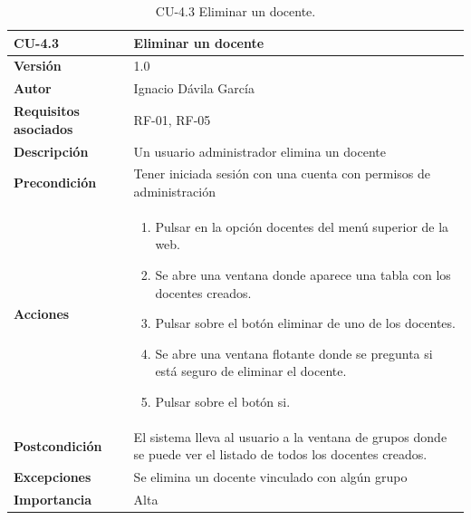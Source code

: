 \begin{table}[p]
	\centering
	\begin{tabularx}{\linewidth}{ p{} p{} }
		\toprule
		\textbf{CU-4.3}    & \textbf{Eliminar un docente}\\
		\toprule
		\textbf{Versión}              & 1.0    \\
		\textbf{Autor}                & Ignacio Dávila García \\
		\textbf{Requisitos asociados} & RF-01, RF-05 \\
		\textbf{Descripción}          & Un usuario administrador elimina un docente \\
		\textbf{Precondición}         & Tener iniciada sesión con una cuenta con permisos de administración \\
		\textbf{Acciones}             &
		\begin{enumerate}
			\def\labelenumi{\arabic{enumi}.}
			\tightlist
			\item Pulsar en la opción docentes del menú superior de la web.
			\item Se abre una ventana donde aparece una tabla con los docentes creados.
			\item Pulsar sobre el botón eliminar de uno de los docentes.
			\item Se abre una ventana flotante donde se pregunta si está seguro de eliminar el docente.
			\item Pulsar sobre el botón si.
		\end{enumerate}\\
		\textbf{Postcondición}        & El sistema lleva al usuario a la ventana de grupos donde se puede ver el listado de todos los docentes creados. \\
		\textbf{Excepciones}          & Se elimina un docente vinculado con algún grupo \\
		\textbf{Importancia}          & Alta \\
		\bottomrule
	\end{tabularx}
	\caption{CU-4.3 Eliminar un docente.}
\end{table}

